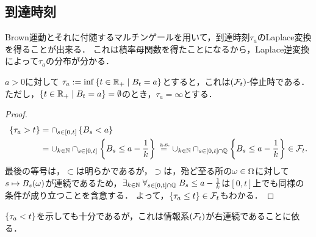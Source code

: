 \documentclass[uplatex,dvipdfmx]{jsreport}
\begin{document}
\subsection{到達時刻}

\begin{tcolorbox}[colframe=ForestGreen, colback=ForestGreen!10!white,breakable,colbacktitle=ForestGreen!40!white,coltitle=black,fonttitle=\bfseries\sffamily,
title=Markov過程の到達時刻はLaplace変換の有名な応用先である]
    Brown運動とそれに付随するマルチンゲールを用いて，到達時刻$\tau_a$のLaplace変換を得ることが出来る．
    これは積率母関数を得たことになるから，Laplace逆変換によって$\tau_a$の分布が分かる．
\end{tcolorbox}

\begin{lemma}[到達時刻]
    $a>0$に対して
    $\tau_a:=\inf\left\{t\in\mathbb{R}_+\mid B_t=a\right\}$とすると，これは$(\mathcal{F}_t)$-停止時である．
    ただし，$\left\{t\in\mathbb{R}_+\mid B_t=a\right\}=\emptyset$のとき，$\tau_a=\infty$とする．
\end{lemma}
\begin{proof}
    \begin{align*}
        \left\{\tau_a>t\right\}&=\cap_{s\in[0,t]}\left\{B_s<a\right\}\\
        &=\cup_{k\in\mathbb{N}}\cap_{s\in[0,t]}\left\{B_s\le a-\frac{1}{k}\right\}\overset{\;\mathrm{a.s.}}{=}\cup_{k\in\mathbb{N}}\cap_{s\in[0,t]\cap\mathbb{Q}}\left\{B_s\le a-\frac{1}{k}\right\}\in\mathcal{F}_t.
    \end{align*}
    最後の等号は，$\subset$は明らかであるが，$\supset$は，殆ど至る所の$\omega\in\Omega$に対して$s\mapsto B_s(\omega)$が連続であるため，$\exists_{k\in\mathbb{N}}\;\forall_{s\in[0,t]\cap\mathbb{Q}}\;B_s\le a-\frac{1}{k}$は$[0,t]$上でも同様の条件が成り立つことを含意する．
    よって，$\left\{\tau_a\le t\right\}\in\mathcal{F}_t$もわかる．
\end{proof}
\begin{remarks}
    $\left\{\tau_a<t\right\}$を示しても十分であるが，これは情報系$(\mathcal{F}_t)$が右連続であることに依る．
\end{remarks}
\end{document}
